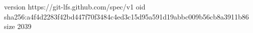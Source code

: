 version https://git-lfs.github.com/spec/v1
oid sha256:a4f4d2283f42bd447f70f3484c4ed3c15d95a591d19abbc009b56cb8a3911b86
size 2039

